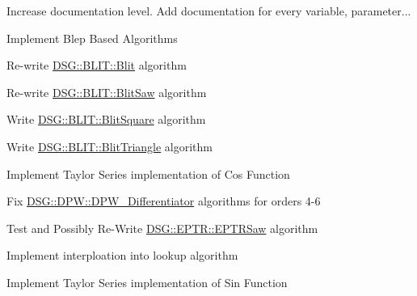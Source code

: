 
\begin{DoxyRefList}
\item[\label{todo__todo000006}%
\hypertarget{todo__todo000006}{}%
Namespace \hyperlink{namespace_d_s_g}{D\+S\+G} ]Increase documentation level. Add documentation for every variable, parameter... 

Implement Blep Based Algorithms  
\item[\label{todo__todo000001}%
\hypertarget{todo__todo000001}{}%
Class \hyperlink{class_d_s_g_1_1_b_l_i_t_1_1_blit}{D\+S\+G\+:\+:B\+L\+I\+T\+:\+:Blit} ]Re-\/write \hyperlink{class_d_s_g_1_1_b_l_i_t_1_1_blit}{D\+S\+G\+::\+B\+L\+I\+T\+::\+Blit} algorithm  
\item[\label{todo__todo000002}%
\hypertarget{todo__todo000002}{}%
Class \hyperlink{class_d_s_g_1_1_b_l_i_t_1_1_blit_saw}{D\+S\+G\+:\+:B\+L\+I\+T\+:\+:Blit\+Saw} ]Re-\/write \hyperlink{class_d_s_g_1_1_b_l_i_t_1_1_blit_saw}{D\+S\+G\+::\+B\+L\+I\+T\+::\+Blit\+Saw} algorithm  
\item[\label{todo__todo000003}%
\hypertarget{todo__todo000003}{}%
Class \hyperlink{class_d_s_g_1_1_b_l_i_t_1_1_blit_square}{D\+S\+G\+:\+:B\+L\+I\+T\+:\+:Blit\+Square} ]Write \hyperlink{class_d_s_g_1_1_b_l_i_t_1_1_blit_square}{D\+S\+G\+::\+B\+L\+I\+T\+::\+Blit\+Square} algorithm  
\item[\label{todo__todo000004}%
\hypertarget{todo__todo000004}{}%
Class \hyperlink{class_d_s_g_1_1_b_l_i_t_1_1_blit_triangle}{D\+S\+G\+:\+:B\+L\+I\+T\+:\+:Blit\+Triangle} ]Write \hyperlink{class_d_s_g_1_1_b_l_i_t_1_1_blit_triangle}{D\+S\+G\+::\+B\+L\+I\+T\+::\+Blit\+Triangle} algorithm  
\item[\label{todo__todo000010}%
\hypertarget{todo__todo000010}{}%
Member \hyperlink{namespace_d_s_g_ade303ad15c77f534429305c3cbd90191}{D\+S\+G\+:\+:Cos} (double const \&x)]Implement Taylor Series implementation of Cos Function  
\item[\label{todo__todo000005}%
\hypertarget{todo__todo000005}{}%
Class \hyperlink{class_d_s_g_1_1_d_p_w_1_1_d_p_w___differentiator}{D\+S\+G\+:\+:D\+P\+W\+:\+:D\+P\+W\+\_\+\+Differentiator$<$ order $>$} ]Fix \hyperlink{class_d_s_g_1_1_d_p_w_1_1_d_p_w___differentiator}{D\+S\+G\+::\+D\+P\+W\+::\+D\+P\+W\+\_\+\+Differentiator} algorithms for orders 4-\/6  
\item[\label{todo__todo000007}%
\hypertarget{todo__todo000007}{}%
Class \hyperlink{class_d_s_g_1_1_e_p_t_r_1_1_e_p_t_r_saw}{D\+S\+G\+:\+:E\+P\+T\+R\+:\+:E\+P\+T\+R\+Saw} ]Test and Possibly Re-\/\+Write \hyperlink{class_d_s_g_1_1_e_p_t_r_1_1_e_p_t_r_saw}{D\+S\+G\+::\+E\+P\+T\+R\+::\+E\+P\+T\+R\+Saw} algorithm  
\item[\label{todo__todo000008}%
\hypertarget{todo__todo000008}{}%
Class \hyperlink{class_d_s_g_1_1_l_u_t}{D\+S\+G\+:\+:L\+U\+T$<$ element, size $>$} ]Implement interploation into lookup algorithm  
\item[\label{todo__todo000009}%
\hypertarget{todo__todo000009}{}%
Member \hyperlink{namespace_d_s_g_aad63d316081c7d13a551acf346ee2749}{D\+S\+G\+:\+:Sin} (double const \&x)]Implement Taylor Series implementation of Sin Function 
\end{DoxyRefList}